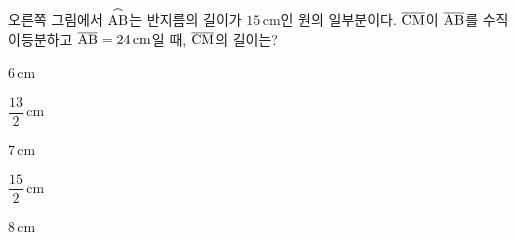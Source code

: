 \noindent\begin{minipage}[t]{0.58\linewidth}\vspace{0pt}\raggedright 오른쪽 그림에서 $\overset{\frown}{\mathrm{AB}}$는 반지름의 길이가 $15\,\mathrm{cm}$인 원의 일부분이다. $\overline{\mathrm{CM}}$이 $\overline{\mathrm{AB}}$를 수직이등분하고 $\overline{\mathrm{AB}}=24\,\mathrm{cm}$일 때, $\overline{\mathrm{CM}}$의 길이는?\end{minipage}\hfill\begin{minipage}[t]{0.4\linewidth}\vspace{0pt}\centering \resizebox{\ifdim\width>\linewidth\linewidth\else\width\fi}{!}{}\end{minipage}\par
\begin{choices32}{\rule[-3ex]{0pt}{8ex}$6\,\mathrm{cm}$}{\rule[-3ex]{0pt}{8ex}$\dfrac{13}{2}\,\mathrm{cm}$}{\rule[-3ex]{0pt}{8ex}$7\,\mathrm{cm}$}{\rule[-3ex]{0pt}{8ex}$\dfrac{15}{2}\,\mathrm{cm}$}{\rule[-3ex]{0pt}{8ex}$8\,\mathrm{cm}$}\end{choices32}
